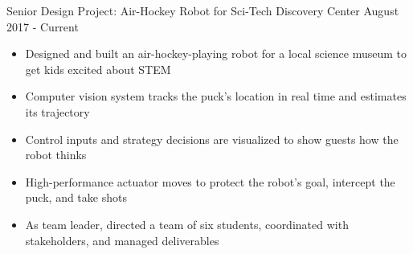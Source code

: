 Senior Design Project: Air-Hockey Robot for Sci-Tech Discovery Center
\hfill
August 2017 - Current
\begin{itemize}
    \item Designed and built an air-hockey-playing robot for a local science museum to get kids excited about STEM
    \item Computer vision system tracks the puck's location in real time and estimates its trajectory
    \item Control inputs and strategy decisions are visualized to show guests how the robot thinks 
    \item High-performance actuator moves to protect the robot's goal, intercept the puck, and take shots
    \item As team leader, directed a team of six students, coordinated with stakeholders, and managed deliverables
\end{itemize}
\vspace{0.5em}
